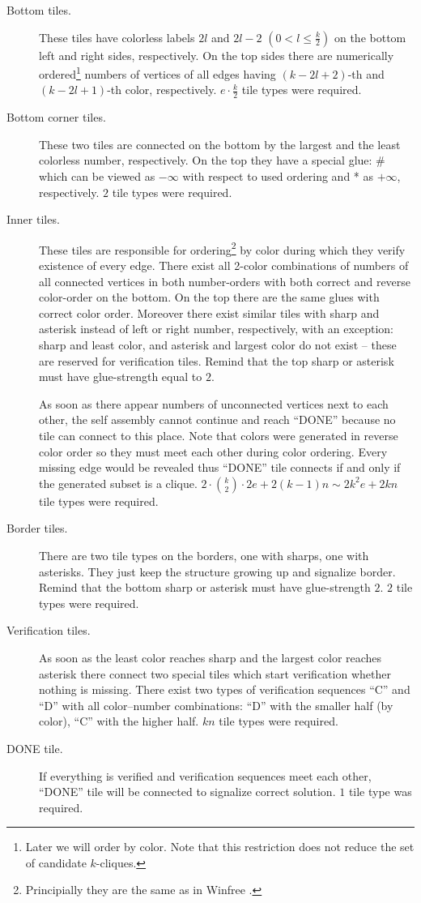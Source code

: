 \begin{description}
	\item[Bottom tiles.] These tiles have colorless labels $2l$ and $2l-2$ $(0 < l \leq \frac{k}{2})$ on the bottom left and right sides, respectively. On the top sides there are numerically ordered\footnote{Later we will order by color. Note that this restriction does not reduce the set of candidate $k$-cliques.} numbers of vertices of all edges having $(k-2l+2)$-th and $(k-2l+1)$-th color, respectively. $e\cdot \frac{k}{2}$ tile types were required.
	\item[Bottom corner tiles.] These two tiles are connected on the bottom by the largest and the least colorless number, respectively. On the top they have a special glue: \# which can be viewed as $-\infty$ with respect to used ordering and * as $+\infty$, respectively. $2$ tile types were required.
	\item[Inner tiles.] These tiles are responsible for ordering\footnote{Principially they are the same as in Winfree \cite{winfree_phd}.} by color during which they verify e\-xi\-stence of every edge. There exist all 2-color combinations of numbers of all connected vertices in both number-orders with both correct and reverse color-order on the bottom. On the top there are the same glues with correct color order. Moreover there exist similar tiles with sharp and asterisk instead of left or right number, respectively, with an exception: sharp and least color, and asterisk and largest color do not exist -- these are reserved for verification tiles. Remind that the top sharp or asterisk must have glue-strength equal to $2$.
	
	As soon as there appear numbers of unconnected vertices next to each other, the self assembly cannot continue and reach ``DONE'' because no tile can connect to this place. Note that colors were generated in reverse color order so they must meet each other during color ordering. Every missing edge would be revealed thus ``DONE'' tile connects if and only if the generated subset is a clique. $2\cdot\binom{k}{2}\cdot 2e + 2(k-1)n \sim 2 k^2 e + 2kn$ tile types were required.
	\item[Border tiles.] There are two tile types on the borders, one with sharps, one with asterisks. They just keep the structure growing up and signalize border. Remind that the bottom sharp or asterisk must have glue-strength $2$. $2$ tile types were required.
	\item[Verification tiles.] As soon as the least color reaches sharp and the largest color reaches asterisk there connect two special tiles which start verification whether nothing is missing. There exist two types of verification sequences ``C'' and ``D'' with all color--number combinations: ``D'' with the smaller half (by color), ``C'' with the higher half. $kn$ tile types were required.
	\item[DONE tile.] If everything is verified and verification sequences meet each other, ``DONE'' tile will be connected to signalize correct solution. $1$ tile type was required.
\end{description}

